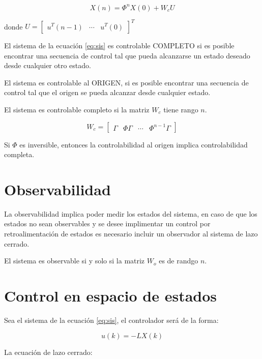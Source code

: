 \begin{equation}
    X(n) = \Phi^n X(0) + W_c U
\end{equation}

donde $U=\begin{bmatrix}
    u^T(n-1) & \cdots & u^T(0) 
\end{bmatrix}^T$

El sistema de la ecuación \ref{eq:sis} es controlable COMPLETO si es posible encontrar 
una secuencia de control tal que pueda alcanzarse un estado deseado desde cualquier otro estado. 

El sistema es controlable al ORIGEN, si es posible encontrar una secuencia de control tal que 
el origen se pueda alcanzar desde cualquier estado. 

El sistema es controlable completo si la matriz $W_c$ tiene rango $n$. 

\begin{equation}
    W_c = 
    \begin{bmatrix}
        \Gamma & \Phi \Gamma & \cdots & \Phi^{n-1}\Gamma
    \end{bmatrix}
\end{equation}

Si $\Phi$ es inversible, entonces la controlabilidad al origen implica controlabilidad 
completa. 

\section{Observabilidad}

La observabilidad implica poder medir los estados del sistema, en caso de que
los estados no sean observables y se desee implimentar un control por retroalimentación de
estados es necesario incluir un observador al sistema de lazo cerrado. 

El sistema es observable si y solo si la matriz $W_o$ es de randgo $n$.

\section{Control en espacio de estados}

Sea el sistema de la ecuación \ref{eq:sis}, el controlador será de la forma: 

\begin{equation}
    u(k) = -LX(k)
\end{equation}

La ecuación de lazo cerrado: 

